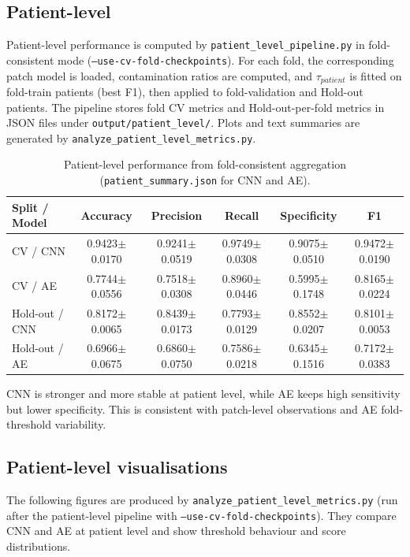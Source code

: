 \documentclass[11pt,a4paper]{article}
\begin{document}
\subsection{Patient-level}
Patient-level performance is computed by \texttt{patient\_level\_pipeline.py} in fold-consistent mode (\texttt{--use-cv-fold-checkpoints}). For each fold, the corresponding patch model is loaded, contamination ratios are computed, and $\tau_{patient}$ is fitted on fold-train patients (best F1), then applied to fold-validation and Hold-out patients. The pipeline stores fold CV metrics and Hold-out-per-fold metrics in JSON files under \texttt{output/patient\_level/}. Plots and text summaries are generated by \texttt{analyze\_patient\_level\_metrics.py}.
\begin{table}[H]
\centering
\small
\setlength{\tabcolsep}{4pt}
\begin{tabular}{lccccc}
\toprule
Split / Model & Accuracy & Precision & Recall & Specificity & F1 \\
\midrule
CV / CNN & 0.9423$\pm$0.0170 & 0.9241$\pm$0.0519 & 0.9749$\pm$0.0308 & 0.9075$\pm$0.0510 & 0.9472$\pm$0.0190 \\
CV / AE & 0.7744$\pm$0.0556 & 0.7518$\pm$0.0308 & 0.8960$\pm$0.0446 & 0.5995$\pm$0.1748 & 0.8165$\pm$0.0224 \\
Hold-out / CNN & 0.8172$\pm$0.0065 & 0.8439$\pm$0.0173 & 0.7793$\pm$0.0129 & 0.8552$\pm$0.0207 & 0.8101$\pm$0.0053 \\
Hold-out / AE & 0.6966$\pm$0.0675 & 0.6860$\pm$0.0750 & 0.7586$\pm$0.0218 & 0.6345$\pm$0.1516 & 0.7172$\pm$0.0383 \\
\bottomrule
\end{tabular}
\caption{Patient-level performance from fold-consistent aggregation (\texttt{patient\_summary.json} for CNN and AE).}
\label{tab:patient_results}
\end{table}

CNN is stronger and more stable at patient level, while AE keeps high sensitivity but lower specificity. This is consistent with patch-level observations and AE fold-threshold variability.

\subsection{Patient-level visualisations}
The following figures are produced by \texttt{analyze\_patient\_level\_metrics.py} (run after the patient-level pipeline with \texttt{--use-cv-fold-checkpoints}). They compare CNN and AE at patient level and show threshold behaviour and score distributions.
\end{document}
